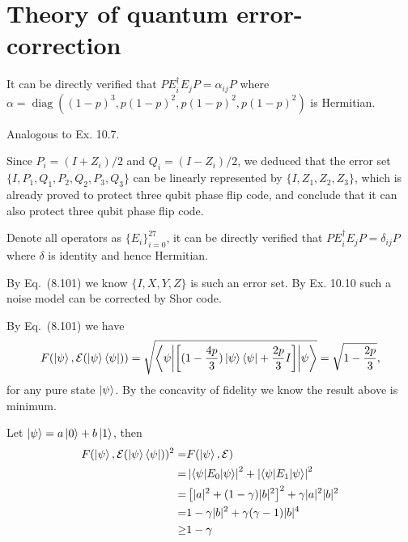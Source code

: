 \section{Theory of quantum error-correction}

\ex It can be directly verified that $PE_i^\dagger E_jP = \alpha_{ij}P$ where $\alpha=\operatorname{diag}((1-p)^3, p(1-p)^2, p(1-p)^2, p(1-p)^2)$ is Hermitian.

\ex Analogous to Ex. 10.7.

\ex Since $P_i = (I + Z_i) / 2$ and $Q_i = (I - Z_i) / 2$, we deduced that the error set $\{I, P_1, Q_1, P_2, Q_2, P_3, Q_3\}$ can be linearly represented by $\{I, Z_1, Z_2, Z_3\}$, which is already proved to protect three qubit phase flip code, and conclude that it can also protect three qubit phase flip code.

\ex Denote all operators as $\{E_i\}_{i=0}^{27}$, it can be directly verified that $PE_i^\dagger E_jP = \delta_{ij}P$ where $\delta$ is identity and hence Hermitian.

\ex By Eq.~(8.101) we know $\{I, X, Y, Z\}$ is such an error set.
By Ex. 10.10 such a noise model can be corrected by Shor code.

\ex By Eq.~(8.101) we have
$$
F(\left|\psi\right\rangle, \mathcal{E}(\left|\psi\right\rangle\left\langle\psi\right|)) = \sqrt{\left\langle\psi\middle|\left[(1-\frac{4p}{3})\left|\psi\right\rangle\left\langle\psi\right|+\frac{2p}{3}I\right]\middle|\psi\right\rangle} = \sqrt{1-\frac{2p}{3}},
$$
for any pure state $\left|\psi\right\rangle$.
By the concavity of fidelity we know the result above is minimum.

\ex Let $\left|\psi\right\rangle = a\left|0\right\rangle + b\left|1\right\rangle$, then
$$\begin{aligned}
F(\left|\psi\right\rangle, \mathcal{E}(\left|\psi\right\rangle\left\langle\psi\right|))^2
= & F(\left|\psi\right\rangle, \mathcal{E})
\\ = & \left|\left\langle\psi\middle|E_0\middle|\psi\right\rangle\right|^2 + \left|\left\langle\psi\middle|E_1\middle|\psi\right\rangle\right|^2
\\ = & \left[|a|^2+(1-\gamma)|b|^2\right]^2+\gamma|a|^2|b|^2
\\ = & 1 - \gamma|b|^2 + \gamma(\gamma - 1)|b|^4
\\ \ge & 1 - \gamma
\end{aligned}$$
